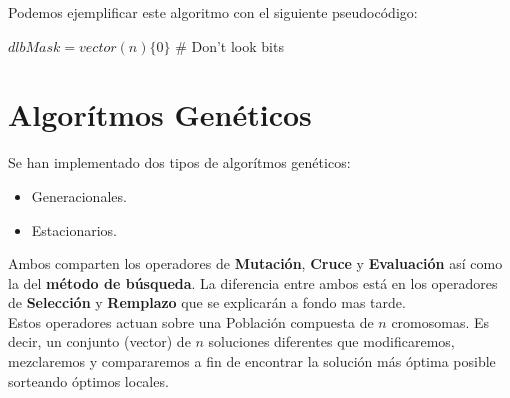 \documentclass[a4paper, 12pt]{article}
\begin{document}
      Podemos ejemplificar este algoritmo con el siguiente pseudocódigo:
      \begin{algorithm}
         $dlbMask = vector(n)\{0\}$ \# Don't look bits\\
      \end{algorithm}
      
      
      \newpage
      \section{Algorítmos Genéticos}      
      Se han implementado dos tipos de algorítmos genéticos:
      \begin{itemize}
      	\item Generacionales.
      	\item Estacionarios.
      \end{itemize}
       
       Ambos comparten los operadores de \textbf{Mutación}, \textbf{Cruce} y \textbf{Evaluación} así como la del \textbf{método de búsqueda}. La diferencia entre ambos está en los operadores de \textbf{Selección} y \textbf{Remplazo} que se explicarán a fondo mas tarde.\\
       
       Estos operadores actuan sobre una Población compuesta de $n$ cromosomas. Es decir, un conjunto (vector) de $n$ soluciones diferentes que modificaremos, mezclaremos y compararemos a fin de encontrar la solución más óptima posible sorteando óptimos locales. 
       
\end{document}
